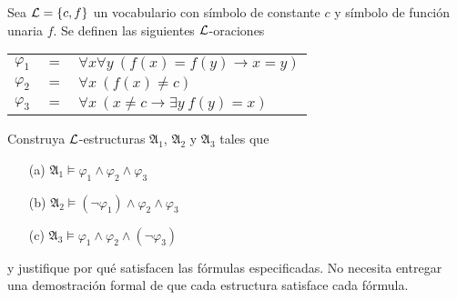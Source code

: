 Sea $\mathcal{L}=\{c,f\}$ un vocabulario con símbolo de constante $c$ y símbolo de función unaria $f$. Se definen las siguientes $\mathcal{L}$-oraciones 
\begin{center}
    \begin{tabular}{rcl}
        $\varphi_1$ & $=$ & $\forall x\forall y\ (f(x)=f(y)\rightarrow x=y)$\\
        $\varphi_2$ & $=$ & $\forall x\ (f(x)\neq c)$\\
        $\varphi_3$ & $=$ & $\forall x\ (x\neq c\rightarrow \exists y\ f(y)=x)$\\
    \end{tabular}
\end{center}
Construya $\mathcal{L}$-estructuras $\mathfrak{A}_1$, $\mathfrak{A}_2$ y $\mathfrak{A}_3$ tales que
\begin{enumerate}
    \item[(a)] $\mathfrak{A}_1\models \varphi_1\wedge\varphi_2\wedge\varphi_3$
    \item[(b)] $\mathfrak{A}_2\models (\neg\varphi_1)\wedge\varphi_2\wedge\varphi_3$
    \item[(c)] $\mathfrak{A}_3\models \varphi_1\wedge\varphi_2\wedge(\neg\varphi_3)$
\end{enumerate}
y justifique por qué satisfacen las fórmulas especificadas. No necesita entregar una demostración formal de que cada estructura satisface cada fórmula.